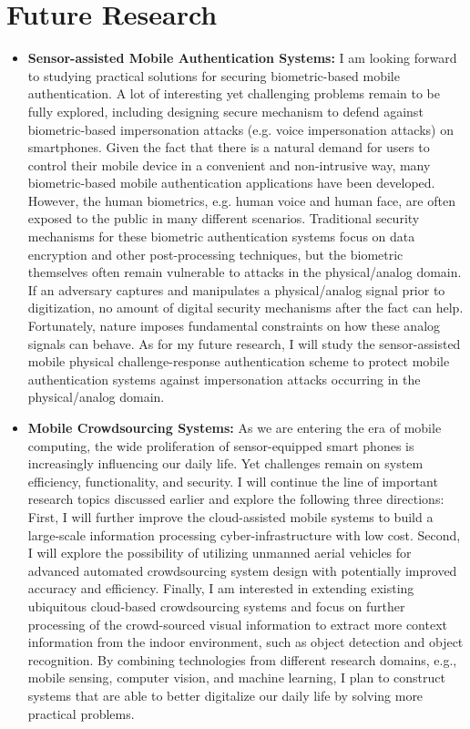 \documentclass[11pt]{article}
\begin{document}
\section*{Future Research}
\begin{itemize}

\item \textbf{Sensor-assisted Mobile Authentication Systems:} I am looking forward to studying practical solutions for securing biometric-based mobile authentication. A lot of interesting yet challenging problems remain to be fully explored, including designing secure mechanism to defend against biometric-based impersonation attacks (e.g. voice impersonation attacks) on smartphones. Given the fact that there is a natural demand for users to control their mobile device in a convenient and non-intrusive way, many biometric-based mobile authentication applications have been developed. However, the human biometrics, e.g. human voice and human face, are often exposed to the public in many different scenarios. Traditional security mechanisms for these biometric authentication systems focus on data encryption and other post-processing techniques, but the biometric themselves often remain vulnerable to attacks in the physical/analog domain. If an adversary captures and manipulates a physical/analog signal prior to digitization, no amount of digital security mechanisms after the fact can help. Fortunately, nature imposes fundamental constraints on how these analog signals can behave. As for my future research, I will study the sensor-assisted mobile physical challenge-response authentication scheme to protect mobile authentication systems against impersonation attacks occurring in the physical/analog domain.

\item
\textbf{Mobile Crowdsourcing Systems:} As we are entering the era of mobile computing, the wide proliferation of sensor-equipped smart phones is increasingly influencing our daily life. Yet challenges remain on system efficiency, functionality, and security. I will continue the line of important research topics discussed earlier and explore the following three directions: First, I will further improve the cloud-assisted mobile systems to build a large-scale information processing cyber-infrastructure with low cost. Second, I will explore the possibility of utilizing unmanned aerial vehicles for advanced automated crowdsourcing system design with potentially improved accuracy and efficiency. Finally, I am interested in extending existing ubiquitous cloud-based crowdsourcing systems and focus on further processing of the crowd-sourced visual information to extract more context information from the indoor environment, such as object detection and object recognition. By combining technologies from different research domains, e.g., mobile sensing, computer vision, and machine learning, I plan to construct systems that are able to better digitalize our daily life by solving more practical problems. 


\end{itemize}
\end{document}
